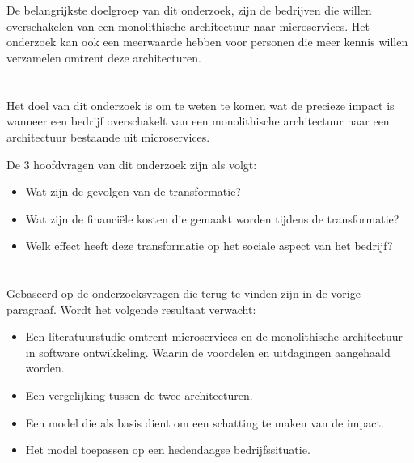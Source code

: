 \section{}
\label{sec:probleemstelling}

De belangrijkste doelgroep van dit onderzoek, zijn de bedrijven die willen overschakelen van een monolithische architectuur naar microservices. Het onderzoek kan ook een meerwaarde hebben voor personen die meer kennis willen verzamelen omtrent deze architecturen. 

\section{}
\label{sec:onderzoeksvraag}

Het doel van dit onderzoek is om te weten te komen wat de precieze impact is wanneer een bedrijf overschakelt van een monolithische architectuur naar een architectuur bestaande uit microservices.

De 3 hoofdvragen van dit onderzoek zijn als volgt:
\begin{itemize}
    \item Wat zijn de gevolgen van de transformatie?
    \item Wat zijn de financiële kosten die gemaakt worden tijdens de transformatie?
    \item Welk effect heeft deze transformatie op het sociale aspect van het bedrijf?
\end{itemize}

\section{}
\label{sec:onderzoeksdoelstelling}

Gebaseerd op de onderzoeksvragen die terug te vinden zijn in de vorige paragraaf. Wordt het volgende resultaat verwacht:

\begin{itemize}
    \item Een literatuurstudie omtrent microservices en de monolithische architectuur in software ontwikkeling. Waarin de voordelen en uitdagingen aangehaald worden.
    \item Een vergelijking tussen de twee architecturen. 
    \item Een model die als basis dient om een schatting te maken van de impact.
    \item Het model toepassen op een hedendaagse bedrijfssituatie.
\end{itemize}

